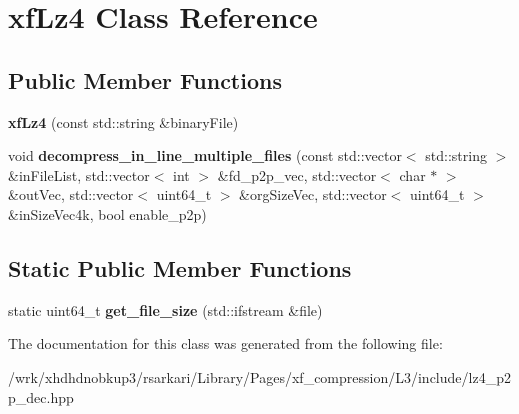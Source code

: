 \hypertarget{classxfLz4}{\section{xf\-Lz4 Class Reference}
\label{classxfLz4}
}
\subsection*{Public Member Functions}
\begin{DoxyCompactItemize}
\item 
\hypertarget{classxfLz4_aa8ba8ffba63ceb3d39a1600ccc36b227}{{\bfseries xf\-Lz4} (const std\-::string \&binary\-File)}\label{classxfLz4_aa8ba8ffba63ceb3d39a1600ccc36b227}

\item 
\hypertarget{classxfLz4_a528f929539a52ae3693c8427da480ba6}{void {\bfseries decompress\-\_\-in\-\_\-line\-\_\-multiple\-\_\-files} (const std\-::vector$<$ std\-::string $>$ \&in\-File\-List, std\-::vector$<$ int $>$ \&fd\-\_\-p2p\-\_\-vec, std\-::vector$<$ char $\ast$ $>$ \&out\-Vec, std\-::vector$<$ uint64\-\_\-t $>$ \&org\-Size\-Vec, std\-::vector$<$ uint64\-\_\-t $>$ \&in\-Size\-Vec4k, bool enable\-\_\-p2p)}\label{classxfLz4_a528f929539a52ae3693c8427da480ba6}

\end{DoxyCompactItemize}
\subsection*{Static Public Member Functions}
\begin{DoxyCompactItemize}
\item 
\hypertarget{classxfLz4_ae646fa73ab42f5b86172d5bedb18f8bd}{static uint64\-\_\-t {\bfseries get\-\_\-file\-\_\-size} (std\-::ifstream \&file)}\label{classxfLz4_ae646fa73ab42f5b86172d5bedb18f8bd}

\end{DoxyCompactItemize}


The documentation for this class was generated from the following file\-:\begin{DoxyCompactItemize}
\item 
/wrk/xhdhdnobkup3/rsarkari/\-Library/\-Pages/xf\-\_\-compression/\-L3/include/lz4\-\_\-p2p\-\_\-dec.\-hpp\end{DoxyCompactItemize}
